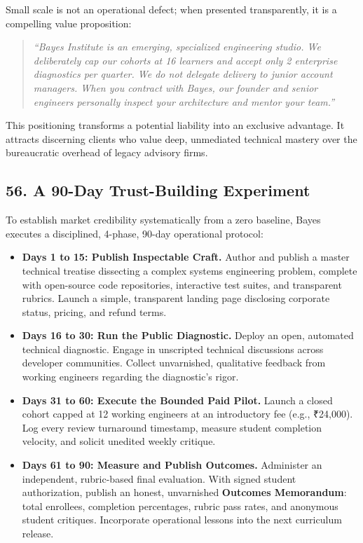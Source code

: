 Small scale is not an operational defect; when presented transparently, it is a compelling value proposition:
\begin{quote}
\textit{``Bayes Institute is an emerging, specialized engineering studio. We deliberately cap our cohorts at 16 learners and accept only 2 enterprise diagnostics per quarter. We do not delegate delivery to junior account managers. When you contract with Bayes, our founder and senior engineers personally inspect your architecture and mentor your team.''}
\end{quote}

This positioning transforms a potential liability into an exclusive advantage. It attracts discerning clients who value deep, unmediated technical mastery over the bureaucratic overhead of legacy advisory firms.

\subsection*{56. A 90-Day Trust-Building Experiment}

To establish market credibility systematically from a zero baseline, Bayes executes a disciplined, 4-phase, 90-day operational protocol:
\begin{itemize}
\item \textbf{Days 1 to 15: Publish Inspectable Craft.} Author and publish a master technical treatise dissecting a complex systems engineering problem, complete with open-source code repositories, interactive test suites, and transparent rubrics. Launch a simple, transparent landing page disclosing corporate status, pricing, and refund terms.
\item \textbf{Days 16 to 30: Run the Public Diagnostic.} Deploy an open, automated technical diagnostic. Engage in unscripted technical discussions across developer communities. Collect unvarnished, qualitative feedback from working engineers regarding the diagnostic's rigor.
\item \textbf{Days 31 to 60: Execute the Bounded Paid Pilot.} Launch a closed cohort capped at 12 working engineers at an introductory fee (e.g., ₹24,000). Log every review turnaround timestamp, measure student completion velocity, and solicit unedited weekly critique.
\item \textbf{Days 61 to 90: Measure and Publish Outcomes.} Administer an independent, rubric-based final evaluation. With signed student authorization, publish an honest, unvarnished \textbf{Outcomes Memorandum}: total enrollees, completion percentages, rubric pass rates, and anonymous student critiques. Incorporate operational lessons into the next curriculum release.
\end{itemize}

